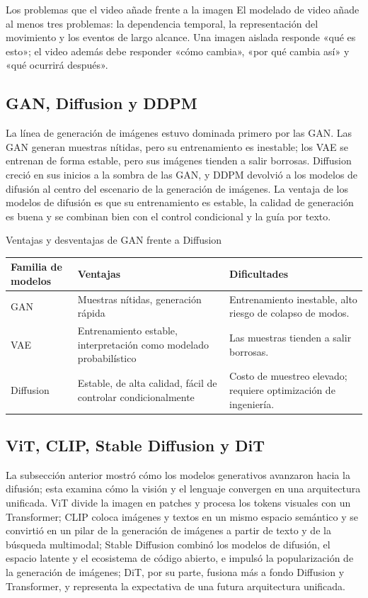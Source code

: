 \begin{importantbox}{Los problemas que el video añade frente a la imagen}
El modelado de video añade al menos tres problemas: la dependencia temporal, la representación del movimiento y los eventos de largo alcance. Una imagen aislada responde «qué es esto»; el video además debe responder «cómo cambia», «por qué cambia así» y «qué ocurrirá después».
\end{importantbox}

\subsection{GAN, Diffusion y DDPM}

La línea de generación de imágenes estuvo dominada primero por las GAN. Las GAN generan muestras nítidas, pero su entrenamiento es inestable; los VAE se entrenan de forma estable, pero sus imágenes tienden a salir borrosas. Diffusion creció en sus inicios a la sombra de las GAN, y DDPM devolvió a los modelos de difusión al centro del escenario de la generación de imágenes. La ventaja de los modelos de difusión es que su entrenamiento es estable, la calidad de generación es buena y se combinan bien con el control condicional y la guía por texto.

\begin{knowledgebox}{Ventajas y desventajas de GAN frente a Diffusion}
\begin{tabularx}{\textwidth}{p{}p{}X}
\toprule
Familia de modelos & Ventajas & Dificultades \\
\midrule
GAN & Muestras nítidas, generación rápida & Entrenamiento inestable, alto riesgo de colapso de modos. \\
VAE & Entrenamiento estable, interpretación como modelado probabilístico & Las muestras tienden a salir borrosas. \\
Diffusion & Estable, de alta calidad, fácil de controlar condicionalmente & Costo de muestreo elevado; requiere optimización de ingeniería. \\
\bottomrule
\end{tabularx}
\end{knowledgebox}

\subsection{ViT, CLIP, Stable Diffusion y DiT}

La subsección anterior mostró cómo los modelos generativos avanzaron hacia la difusión; esta examina cómo la visión y el lenguaje convergen en una arquitectura unificada. ViT divide la imagen en patches y procesa los tokens visuales con un Transformer; CLIP coloca imágenes y textos en un mismo espacio semántico y se convirtió en un pilar de la generación de imágenes a partir de texto y de la búsqueda multimodal; Stable Diffusion combinó los modelos de difusión, el espacio latente y el ecosistema de código abierto, e impulsó la popularización de la generación de imágenes; DiT, por su parte, fusiona más a fondo Diffusion y Transformer, y representa la expectativa de una futura arquitectura unificada.

